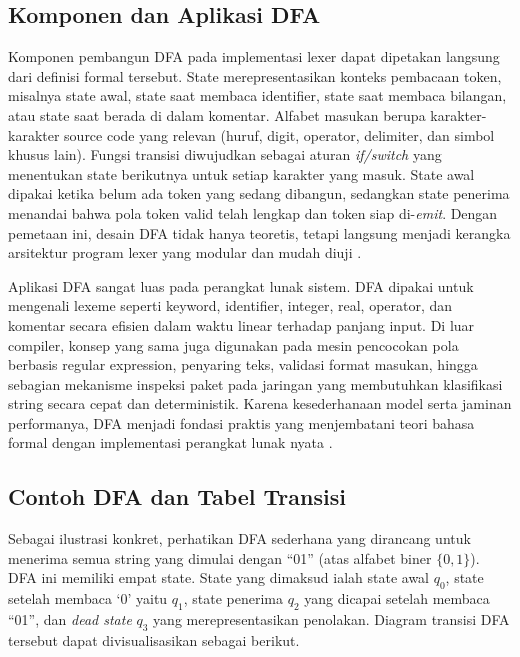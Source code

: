 \subsection{Komponen dan Aplikasi DFA}

Komponen pembangun DFA pada implementasi lexer dapat dipetakan langsung dari definisi formal tersebut. State merepresentasikan konteks pembacaan token, misalnya state awal, state saat membaca identifier, state saat membaca bilangan, atau state saat berada di dalam komentar. Alfabet masukan berupa karakter-karakter source code yang relevan (huruf, digit, operator, delimiter, dan simbol khusus lain). Fungsi transisi diwujudkan sebagai aturan \textit{if/switch} yang menentukan state berikutnya untuk setiap karakter yang masuk. State awal dipakai ketika belum ada token yang sedang dibangun, sedangkan state penerima menandai bahwa pola token valid telah lengkap dan token siap di-\textit{emit}. Dengan pemetaan ini, desain DFA tidak hanya teoretis, tetapi langsung menjadi kerangka arsitektur program lexer yang modular dan mudah diuji \cite{aho2007compilers,grune2012modern}.

Aplikasi DFA sangat luas pada perangkat lunak sistem. DFA dipakai untuk mengenali lexeme seperti keyword, identifier, integer, real, operator, dan komentar secara efisien dalam waktu linear terhadap panjang input. Di luar compiler, konsep yang sama juga digunakan pada mesin pencocokan pola berbasis regular expression, penyaring teks, validasi format masukan, hingga sebagian mekanisme inspeksi paket pada jaringan yang membutuhkan klasifikasi string secara cepat dan deterministik. Karena kesederhanaan model serta jaminan performanya, DFA menjadi fondasi praktis yang menjembatani teori bahasa formal dengan implementasi perangkat lunak nyata \cite{aho2007compilers,hopcroft2006automata}.

\subsection{Contoh DFA dan Tabel Transisi}

Sebagai ilustrasi konkret, perhatikan DFA sederhana yang dirancang untuk menerima semua string yang dimulai dengan ``01'' (atas alfabet biner $\{0, 1\}$). DFA ini memiliki empat state. State yang dimaksud ialah state awal $q_0$, state setelah membaca `0' yaitu $q_1$, state penerima $q_2$ yang dicapai setelah membaca ``01'', dan \textit{dead state} $q_3$ yang merepresentasikan penolakan. Diagram transisi DFA tersebut dapat divisualisasikan sebagai berikut.

